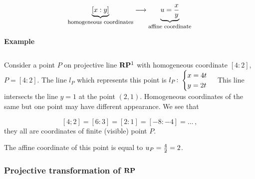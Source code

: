 \documentclass[12pt]{article}
\numberwithin{equation}{section}
\begin{document}
       \begin{equation*}
        \begin{matrix}
  \underbrace{ [x:y]}_{\hbox {\footnotesize homogeneous coordinates}} 
      \longrightarrow  
\underbrace{u={x\over y}}_{\hbox{\footnotesize affine coordinate}}\cr
       \end{matrix}
      \end{equation*}

\smallskip

{\bf Example}

    \begin{equation*}
     \end{equation*} 


Consider a point $P$ on projective line ${\bf R}{\bf P}^1$
with homogeneous coordinate $[4:2]$,
$P=[4:2]$.   The line $l_P$ which represents this point
is 
$l_P\colon 
\begin{cases} x=4t\cr y=2t\cr\end{cases}$
This line intersects the line $y=1$ at the point
$(2,1)$. Homogeneous coordinates of the same but one point 
may have different appearance. We see that 

          $$
[4;2]=[6:3]=[2:1]=[-8:-4]=\dots\,,
         $$
they all are coordinates of finite (visible) point
   $P$.

The affine coordinate of this point is equal to
  $u_P={4\over 2}=2$. 



\subsubsection {Projective transformation of ${\bf R}{\bf P}$}
\end{document}
